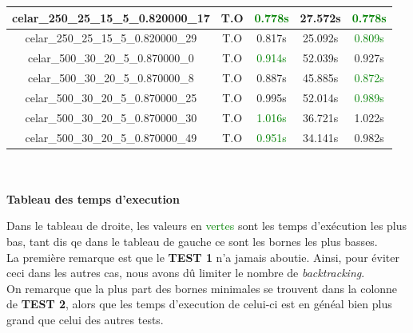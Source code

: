 \documentclass[a4paper, 10pt]{article}
\begin{document}
\begin{minipage}[t]{0.6\linewidth}
\begin{tabular}{| c | c | c| c| c |}
           \hline
           celar\_250\_25\_15\_5\_0.820000\_17 & \textcolor[gray]{0.6}{T.O} &\textcolor{green}{0.778s} & 27.572s & \textcolor{green}{0.778s} \\
           \hline
           celar\_250\_25\_15\_5\_0.820000\_29 & \textcolor[gray]{0.6}{T.O}  &  0.817s & 25.092s & \textcolor{green}{0.809s} \\
           \hline
           celar\_500\_30\_20\_5\_0.870000\_0 & \textcolor[gray]{0.6}{T.O} & \textcolor{green}{0.914s} & 52.039s & 0.927s  \\
           \hline
           celar\_500\_30\_20\_5\_0.870000\_8 & \textcolor[gray]{0.6}{T.O} & 0.887s & 45.885s & \textcolor{green}{0.872s} \\
           \hline
           celar\_500\_30\_20\_5\_0.870000\_25 & \textcolor[gray]{0.6}{T.O} & 0.995s & 52.014s & \textcolor{green}{0.989s} \\
           \hline
           celar\_500\_30\_20\_5\_0.870000\_30 & \textcolor[gray]{0.6}{T.O} &  \textcolor{green}{1.016s} & 36.721s & 1.022s \\
           \hline
           celar\_500\_30\_20\_5\_0.870000\_49 &\textcolor[gray]{0.6}{T.O}  &  \textcolor{green}{0.951s} & 34.141s & 0.982s \\
           \hline
         \end{tabular}
         ~\\\\
         \centering
         \textbf{\large Tableau des temps d'execution} %
       \end{minipage}

       Dans le tableau de droite, les valeurs en \textcolor{green}{vertes} sont les temps d'exécution les plus bas, tant dis qe dans le tableau de gauche ce sont les bornes les plus basses. \\
       La première remarque est que le \textbf{TEST 1} n'a jamais aboutie. Ainsi, pour éviter ceci dans les autres cas, nous avons dû limiter le nombre de \textit{backtracking}. \\
       On remarque que la plus part des bornes minimales se trouvent dans la colonne de \textbf{TEST 2}, alors que les temps d'execution de celui-ci est en généal bien plus grand que celui des autres tests.
\end{document}
